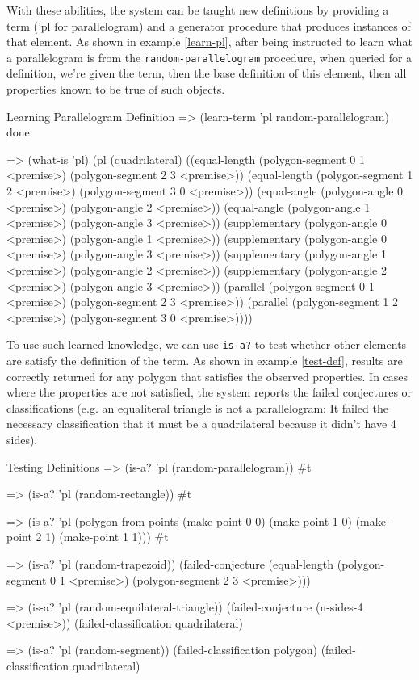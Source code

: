 With these abilities, the system can be taught new definitions by
providing a term ('pl for parallelogram) and a generator procedure
that produces instances of that element. As shown in example
\ref{learn-pl}, after being instructed to learn what a parallelogram
is from the \texttt{random-parallelogram} procedure, when queried for
a definition, we're given the term, then the base definition of this
element, then all properties known to be true of such objects.

\begin{repl-example}
[label=learn-pl]
{Learning Parallelogram Definition}
=> (learn-term 'pl random-parallelogram)
done

=> (what-is 'pl)
(pl
 (quadrilateral)
 ((equal-length (polygon-segment 0 1 <premise>)
                (polygon-segment 2 3 <premise>))
  (equal-length (polygon-segment 1 2 <premise>)
                (polygon-segment 3 0 <premise>))
  (equal-angle (polygon-angle 0 <premise>)
               (polygon-angle 2 <premise>))
  (equal-angle (polygon-angle 1 <premise>)
               (polygon-angle 3 <premise>))
  (supplementary (polygon-angle 0 <premise>)
                 (polygon-angle 1 <premise>))
  (supplementary (polygon-angle 0 <premise>)
                 (polygon-angle 3 <premise>))
  (supplementary (polygon-angle 1 <premise>)
                 (polygon-angle 2 <premise>))
  (supplementary (polygon-angle 2 <premise>)
                 (polygon-angle 3 <premise>))
  (parallel (polygon-segment 0 1 <premise>)
            (polygon-segment 2 3 <premise>))
  (parallel (polygon-segment 1 2 <premise>)
            (polygon-segment 3 0 <premise>))))
\end{repl-example}

To use such learned knowledge, we can use \texttt{is-a?} to test
whether other elements are satisfy the definition of the term. As
shown in example \ref{test-def}, results are correctly returned for
any polygon that satisfies the observed properties. In cases where the
properties are not satisfied, the system reports the failed
conjectures or classifications (e.g. an equaliteral triangle is not a
parallelogram: It failed the necessary classification that it must be
a quadrilateral because it didn't have 4 sides).

\begin{repl-example}
[label=test-def]
{Testing Definitions}
=> (is-a? 'pl (random-parallelogram))
#t

=> (is-a? 'pl (random-rectangle))
#t

=> (is-a? 'pl (polygon-from-points
                (make-point 0 0)
                (make-point 1 0)
                (make-point 2 1)
                (make-point 1 1)))
#t


=> (is-a? 'pl (random-trapezoid))
(failed-conjecture
 (equal-length (polygon-segment 0 1 <premise>)
               (polygon-segment 2 3 <premise>)))

=> (is-a? 'pl (random-equilateral-triangle))
(failed-conjecture (n-sides-4 <premise>))
(failed-classification quadrilateral)

=> (is-a? 'pl (random-segment))
(failed-classification polygon)
(failed-classification quadrilateral)
\end{repl-example}

